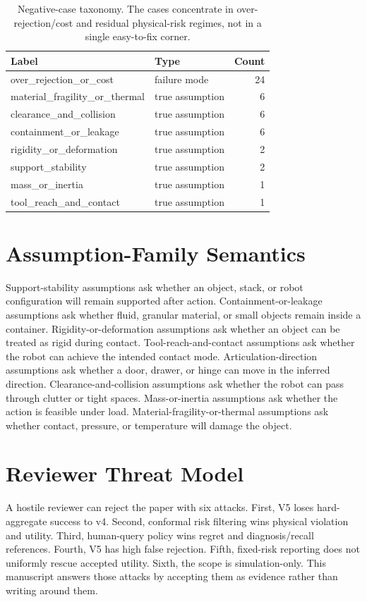 \documentclass{article}
\begin{document}
\begin{table}[t]
\centering
\small
\begin{tabular}{llr}
\toprule
Label & Type & Count \\
\midrule
over\_rejection\_or\_cost & failure mode & 24 \\
material\_fragility\_or\_thermal & true assumption & 6 \\
clearance\_and\_collision & true assumption & 6 \\
containment\_or\_leakage & true assumption & 6 \\
rigidity\_or\_deformation & true assumption & 2 \\
support\_stability & true assumption & 2 \\
mass\_or\_inertia & true assumption & 1 \\
tool\_reach\_and\_contact & true assumption & 1 \\
\bottomrule
\end{tabular}
\caption{Negative-case taxonomy. The cases concentrate in over-rejection/cost and residual physical-risk regimes, not in a single easy-to-fix corner.}
\label{tab:negativetaxonomy}
\end{table}


\section{Assumption-Family Semantics}
Support-stability assumptions ask whether an object, stack, or robot configuration will remain supported after action. Containment-or-leakage assumptions ask whether fluid, granular material, or small objects remain inside a container. Rigidity-or-deformation assumptions ask whether an object can be treated as rigid during contact. Tool-reach-and-contact assumptions ask whether the robot can achieve the intended contact mode. Articulation-direction assumptions ask whether a door, drawer, or hinge can move in the inferred direction. Clearance-and-collision assumptions ask whether the robot can pass through clutter or tight spaces. Mass-or-inertia assumptions ask whether the action is feasible under load. Material-fragility-or-thermal assumptions ask whether contact, pressure, or temperature will damage the object.

\section{Reviewer Threat Model}
A hostile reviewer can reject the paper with six attacks. First, V5 loses hard-aggregate success to v4. Second, conformal risk filtering wins physical violation and utility. Third, human-query policy wins regret and diagnosis/recall references. Fourth, V5 has high false rejection. Fifth, fixed-risk reporting does not uniformly rescue accepted utility. Sixth, the scope is simulation-only. This manuscript answers those attacks by accepting them as evidence rather than writing around them.
\end{document}
